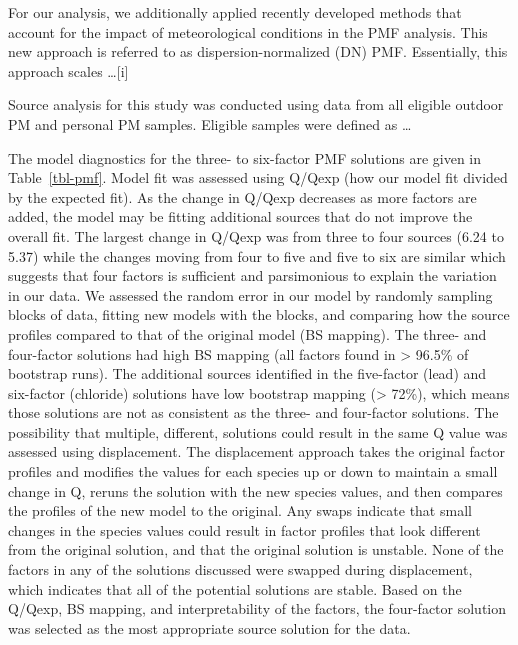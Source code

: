 \documentclass[
  letterpaper,
  DIV=11,
  numbers=noendperiod]{scrartcl}
\begin{document}
For our analysis, we additionally applied recently developed methods
that account for the impact of meteorological conditions in the PMF
analysis. This new approach is referred to as dispersion-normalized (DN)
PMF. Essentially, this approach scales \ldots{[}i{]}

Source analysis for this study was conducted using data from all
eligible outdoor PM and personal PM samples. Eligible samples were
defined as \ldots{}

The model diagnostics for the three- to six-factor PMF solutions are
given in Table~\ref{tbl-pmf}. Model fit was assessed using Q/Qexp (how
our model fit divided by the expected fit). As the change in Q/Qexp
decreases as more factors are added, the model may be fitting additional
sources that do not improve the overall fit. The largest change in
Q/Qexp was from three to four sources (6.24 to 5.37) while the changes
moving from four to five and five to six are similar which suggests that
four factors is sufficient and parsimonious to explain the variation in
our data. We assessed the random error in our model by randomly sampling
blocks of data, fitting new models with the blocks, and comparing how
the source profiles compared to that of the original model (BS mapping).
The three- and four-factor solutions had high BS mapping (all factors
found in \textgreater{} 96.5\% of bootstrap runs). The additional
sources identified in the five-factor (lead) and six-factor (chloride)
solutions have low bootstrap mapping (\textgreater{} 72\%), which means
those solutions are not as consistent as the three- and four-factor
solutions. The possibility that multiple, different, solutions could
result in the same Q value was assessed using displacement. The
displacement approach takes the original factor profiles and modifies
the values for each species up or down to maintain a small change in Q,
reruns the solution with the new species values, and then compares the
profiles of the new model to the original. Any swaps indicate that small
changes in the species values could result in factor profiles that look
different from the original solution, and that the original solution is
unstable. None of the factors in any of the solutions discussed were
swapped during displacement, which indicates that all of the potential
solutions are stable. Based on the Q/Qexp, BS mapping, and
interpretability of the factors, the four-factor solution was selected
as the most appropriate source solution for the data.
\end{document}
